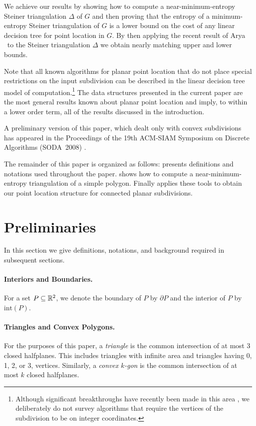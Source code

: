 \documentclass[lotsofwhite]{patmorin}
\newcommand{\boundary}{\partial}
\newcommand{\interior}{\mathrm{int}}
\begin{document}
We achieve our results by showing how to compute a
near-minimum-entropy Steiner triangulation $\Delta$ of $G$ and then
proving that the entropy of a minimum-entropy Steiner triangulation of
$G$ is a lower bound on the cost of any linear decision tree for point
location in $G$.  By then applying the recent result of Arya \etal\ to
the Steiner triangulation $\Delta$ we obtain nearly matching upper and
lower bounds.

Note that all known algorithms for planar point location that do not
place special restrictions on the input subdivision can be described
in the linear decision tree model of computation.\footnote{Although
significant breakthroughs have recently been made in this area
\cite{c06,p06}, we deliberately do not survey algorithms that require
the vertices of the subdivision to be on integer coordinates.}  The
data structures presented in the current paper are the most general
results known about planar point location and imply, to within a
lower order term, all of the results discussed in the introduction.

A preliminary version of this paper, which dealt only with convex
subdivisions has appeared in the Proceedings of the 19th ACM-SIAM
Symposium on Discrete Algorithms (SODA~2008) \cite{cdilm08}.

The remainder of this paper is organized as follows:  
presents definitions and notations used throughout the paper.
 shows how to compute a near-minimum-entropy
triangulation of a simple polygon.  Finally 
applies these tools to obtain our point location structure for
connected planar subdivisions.


\section{Preliminaries}

In this section we give definitions, notations, and background
required in subsequent sections.

\paragraph{Interiors and Boundaries.}
For a set $P\subseteq \mathbb{R}^2$, we denote the boundary of $P$ by $\boundary P$
and the interior of $P$ by $\interior(P)$.


\paragraph{Triangles and Convex Polygons.}  For the purposes of this
paper, a \emph{triangle} is the common intersection of at most 3
closed halfplanes.  This includes triangles with infinite area and
triangles having 0, 1, 2, or 3, vertices. Similarly, a \emph{convex
$k$-gon} is the common intersection of at most $k$ closed halfplanes.
\end{document}
